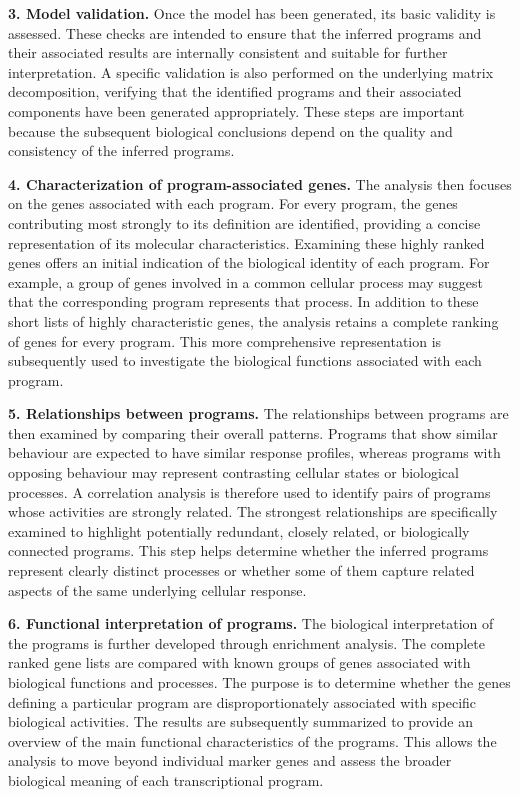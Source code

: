 \documentclass[11pt,a4paper]{article}
\begin{document}
\textbf{3. Model validation.} Once the model has been generated, its basic validity is assessed. These checks are intended to ensure that the inferred programs and their associated results are internally consistent and suitable for further interpretation. A specific validation is also performed on the underlying matrix decomposition, verifying that the identified programs and their associated components have been generated appropriately. These steps are important because the subsequent biological conclusions depend on the quality and consistency of the inferred programs.

\textbf{4. Characterization of program-associated genes.} The analysis then focuses on the genes associated with each program. For every program, the genes contributing most strongly to its definition are identified, providing a concise representation of its molecular characteristics. Examining these highly ranked genes offers an initial indication of the biological identity of each program. For example, a group of genes involved in a common cellular process may suggest that the corresponding program represents that process. In addition to these short lists of highly characteristic genes, the analysis retains a complete ranking of genes for every program. This more comprehensive representation is subsequently used to investigate the biological functions associated with each program.

\textbf{5. Relationships between programs.} The relationships between programs are then examined by comparing their overall patterns. Programs that show similar behaviour are expected to have similar response profiles, whereas programs with opposing behaviour may represent contrasting cellular states or biological processes. A correlation analysis is therefore used to identify pairs of programs whose activities are strongly related. The strongest relationships are specifically examined to highlight potentially redundant, closely related, or biologically connected programs. This step helps determine whether the inferred programs represent clearly distinct processes or whether some of them capture related aspects of the same underlying cellular response.

\textbf{6. Functional interpretation of programs.} The biological interpretation of the programs is further developed through enrichment analysis. The complete ranked gene lists are compared with known groups of genes associated with biological functions and processes. The purpose is to determine whether the genes defining a particular program are disproportionately associated with specific biological activities. The results are subsequently summarized to provide an overview of the main functional characteristics of the programs. This allows the analysis to move beyond individual marker genes and assess the broader biological meaning of each transcriptional program.
\end{document}
